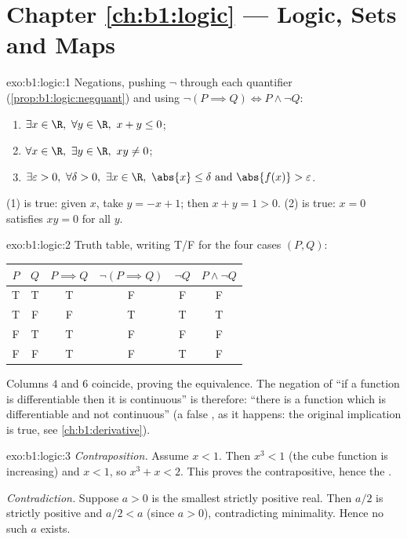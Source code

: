 \section*{Chapter \ref{ch:b1:logic} --- Logic, Sets and Maps}

\begin{solution}{exo:b1:logic:1}
Negations, pushing $\lnot$ through each quantifier
(\cref{prop:b1:logic:negquant}) and using $\lnot(P \implies Q) \iff
P \land \lnot Q$:
\begin{enumerate}
  \item $\exists x \in \R,\ \forall y \in \R,\ x + y \leq 0$;
  \item $\forall x \in \R,\ \exists y \in \R,\ xy \neq 0$;
  \item $\exists \varepsilon > 0,\ \forall \delta > 0,\ \exists x \in
        \R,\ \abs{x} \leq \delta \text{ and } \abs{f(x)} >
        \varepsilon$.
\end{enumerate}
 (1) is true: given $x$, take $y = -x + 1$; then $x + y = 1 >
0$.  (2) is true: $x = 0$ satisfies $xy = 0$ for all $y$.
\end{solution}

\begin{solution}{exo:b1:logic:2}
Truth table, writing T/F for the four cases $(P, Q)$:
\begin{center}
\begin{tabular}{cc|c|c|c|c}
$P$ & $Q$ & $P \implies Q$ & $\lnot(P \implies Q)$ & $\lnot Q$ &
$P \land \lnot Q$ \\
\hline
T & T & T & F & F & F \\
T & F & F & T & T & T \\
F & T & T & F & F & F \\
F & F & T & F & T & F \\
\end{tabular}
\end{center}
Columns $4$ and $6$ coincide, proving the equivalence. The negation of
``if a function is differentiable then it is continuous'' is therefore:
``there is a function which is differentiable and not continuous''
(a false , as it happens: the original implication is true,
see \cref{ch:b1:derivative}).
\end{solution}

\begin{solution}{exo:b1:logic:3}
\emph{Contraposition.} Assume $x < 1$. Then $x^3 < 1$ (the cube
function is increasing) and $x < 1$, so $x^3 + x < 2$. This proves the
contrapositive, hence the .

\emph{Contradiction.} Suppose $a > 0$ is the smallest strictly positive
real. Then $a/2$ is strictly positive and $a/2 < a$ (since $a > 0$),
contradicting minimality. Hence no such $a$ exists.
\end{solution}

